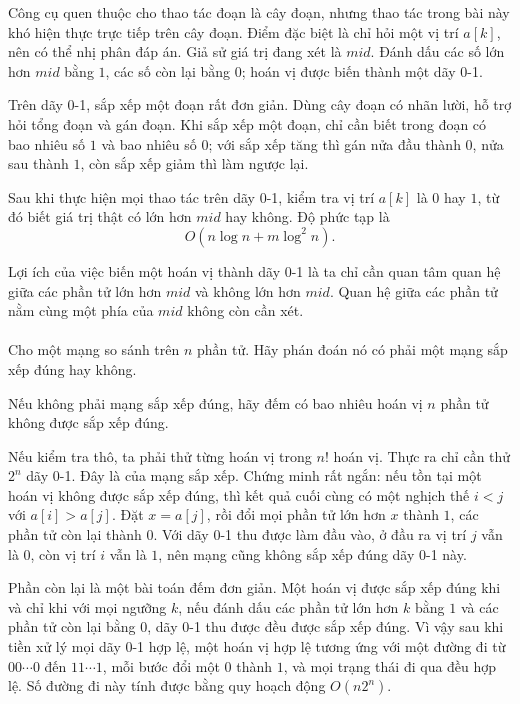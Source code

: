 \documentclass[11pt]{article}
\begin{document}
Công cụ quen thuộc cho thao tác đoạn là cây đoạn, nhưng thao tác trong bài này
khó hiện thực trực tiếp trên cây đoạn. Điểm đặc biệt là chỉ hỏi một vị trí
\(a[k]\), nên có thể nhị phân đáp án. Giả sử giá trị đang xét là
\(\mathit{mid}\). Đánh dấu các số lớn hơn \(\mathit{mid}\) bằng \(1\), các số
còn lại bằng \(0\); hoán vị được biến thành một dãy 0-1.

Trên dãy 0-1, sắp xếp một đoạn rất đơn giản. Dùng cây đoạn có nhãn lười, hỗ
trợ hỏi tổng đoạn và gán đoạn. Khi sắp xếp một đoạn, chỉ cần biết trong đoạn
có bao nhiêu số \(1\) và bao nhiêu số \(0\); với sắp xếp tăng thì gán nửa
đầu thành \(0\), nửa sau thành \(1\), còn sắp xếp giảm thì làm ngược lại.

Sau khi thực hiện mọi thao tác trên dãy 0-1, kiểm tra vị trí \(a[k]\) là
\(0\) hay \(1\), từ đó biết giá trị thật có lớn hơn \(\mathit{mid}\) hay
không. Độ phức tạp là
\[
  O(n\log n+m\log^2 n).
\]

Lợi ích của việc biến một hoán vị thành dãy 0-1 là ta chỉ cần quan tâm quan
hệ giữa các phần tử lớn hơn \(\mathit{mid}\) và không lớn hơn
\(\mathit{mid}\). Quan hệ giữa các phần tử nằm cùng một phía của
\(\mathit{mid}\) không còn cần xét.

\paragraph{}
Cho một mạng so sánh trên \(n\) phần tử. Hãy phán đoán nó có phải một mạng
sắp xếp đúng hay không.

Nếu không phải mạng sắp xếp đúng, hãy đếm có bao nhiêu hoán vị \(n\) phần tử
không được sắp xếp đúng.

Nếu kiểm tra thô, ta phải thử từng hoán vị trong \(n!\) hoán vị. Thực ra chỉ
cần thử \(2^n\) dãy 0-1. Đây là  của mạng sắp xếp. Chứng
minh rất ngắn: nếu tồn tại một hoán vị không được sắp xếp đúng, thì kết quả
cuối cùng có một nghịch thế \(i<j\) với \(a[i]>a[j]\). Đặt \(x=a[j]\), rồi
đổi mọi phần tử lớn hơn \(x\) thành \(1\), các phần tử còn lại thành \(0\).
Với dãy 0-1 thu được làm đầu vào, ở đầu ra vị trí \(j\) vẫn là \(0\), còn vị
trí \(i\) vẫn là \(1\), nên mạng cũng không sắp xếp đúng dãy 0-1 này.

Phần còn lại là một bài toán đếm đơn giản. Một hoán vị được sắp xếp đúng khi
và chỉ khi với mọi ngưỡng \(k\), nếu đánh dấu các phần tử lớn hơn \(k\) bằng
\(1\) và các phần tử còn lại bằng \(0\), dãy 0-1 thu được đều được sắp xếp
đúng. Vì vậy sau khi tiền xử lý mọi dãy 0-1 hợp lệ, một hoán vị hợp lệ tương
ứng với một đường đi từ \(00\cdots0\) đến \(11\cdots1\), mỗi bước đổi một
\(0\) thành \(1\), và mọi trạng thái đi qua đều hợp lệ. Số đường đi này tính
được bằng quy hoạch động \(O(n2^n)\).
\end{document}
